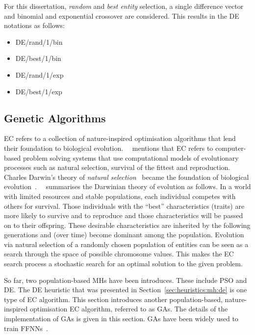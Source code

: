 For this dissertation, \textit{random} and \textit{best entity} selection, a single difference vector and binomial and exponential crossover are considered. This results in the \acs{DE} notations as follows:

\begin{itemize}
      \item DE/rand/1/bin
      \item DE/best/1/bin
      \item DE/rand/1/exp
      \item DE/best/1/exp
\end{itemize}

\subsection{Genetic Algorithms}\label{sec:heuristics:mh:ga}

\Ac{EC} refers to a collection of nature-inspired optimisation algorithms that lend their foundation to biological evolution.~\citeauthor{ref:engelbrecht:2007}~\cite{ref:engelbrecht:2007} mentions that \acs{EC} refers to computer-based problem solving systems that use computational models of evolutionary processes such as natural selection, survival of the fittest and reproduction. Charles Darwin's theory of \textit{natural selection}~\cite{ref:darwin:2012} became the foundation of biological evolution~\cite{ref:darwin:1987}.~\citeauthor{ref:engelbrecht:2007}~\cite{ref:engelbrecht:2007} summarises the Darwinian theory of evolution as follows. In a world with limited resources and stable populations, each individual competes with others for survival. Those individuals with the ``best'' characteristics (traits) are more likely to survive and to reproduce and those characteristics will be passed on to their offspring. These desirable characteristics are inherited by the following generations and (over time) become dominant among the population. Evolution via natural selection of a randomly chosen population of entities can be seen as a search through the space of possible chromosome values. This makes the \acs{EC} search process a stochastic search for an optimal solution to the given problem.

So far, two population-based \acp{MH} have been introduces. These include \acs{PSO} and \acs{DE}. The \acs{DE} heuristic that was presented in Section~\ref{sec:heuristics:mh:de} is one type of \acs{EC} algorithm. This section introduces another population-based, nature-inspired optimisation \acs{EC} algorithm, referred to as \acfp{GA}. The details of the implementation of \acp{GA} is given in this section. \acp{GA} have been widely used to train \acp{FFNN}~\cite{ref:montana:1989, ref:siddique:2001, ref:miller:1989}.

